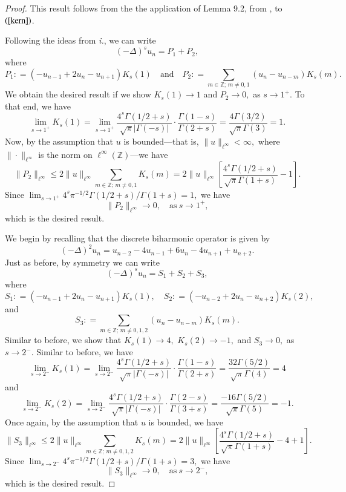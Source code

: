\documentclass[final,1p,times]{elsarticle}
\def\ZZ{\mathbb Z} %
\def\l{\left}
\def\r{\right}
\newcommand{\bb}[1]{\begin{equation}\label{#1}}
\newcommand{\ee}{\end{equation}}
\newcommand{\no}{\noindent}
\def\R#1{$(\ref{#1})$}
\theoremstyle{remark}
\theoremstyle{definition}
\begin{document}
\begin{proof}
\vspace{3mm}

\no{\em ii.} This result follows from the the application of Lemma 9.2, from \cite{ciaurri2016nonlocal}, to \R{kern}.

\vspace{3mm}

\no{\em iii.} Following the ideas from {\em i.}, we can write
$$(-\Delta)^s u_n = P_1 + P_2,$$
where
$$P_1\mathrel{\mathop:}= (-u_{n-1}+2u_n-u_{n+1})K_s(1)\quad\mbox{and}\quad P_2\mathrel{\mathop:}= \sum_{m\in\ZZ;\,m\neq 0,1} (u_n - u_{n-m})K_s(m).$$
We obtain the desired result if we show $K_s(1) \to 1$ and $P_2 \to 0,$ as $s\to 1^+.$ To that end, we have
$$\lim_{s\to 1^+} K_s(1) = \lim_{s\to 1^+} \frac{4^s\Gamma(1/2+s)}{\sqrt{\pi}|\Gamma(-s)|}\cdot\frac{\Gamma(1-s)}{\Gamma(2+s)} = \frac{4\Gamma(3/2)}{\sqrt{\pi}\Gamma(3)} = 1.$$
Now, by the assumption that $u$ is bounded---that is, $\|u\|_{\ell^\infty} < \infty,$ where $\|\cdot\|_{\ell^\infty}$ is the norm  on $\ell^\infty(\ZZ)$---we have
$$\|P_2\|_{\ell^\infty} \le 2\|u\|_{\ell^\infty}\sum_{m\in\ZZ;\,m\neq 0,1} K_s(m) = 2\|u\|_{\ell^\infty}\l[\frac{4^s\Gamma(1/2+s)}{\sqrt{\pi}\Gamma(1+s)} - 1\r].$$
Since $\textstyle\lim_{s\to 1^+} 4^s\pi^{-1/2}\Gamma(1/2+s)/\Gamma(1+s) = 1,$ we have 
$$\|P_2\|_{\ell^\infty} \to 0, \quad \mbox{as}\ s\to 1^+,$$
which is the desired result.

\vspace{3mm}

\no{\em iv.} We begin by recalling that the discrete biharmonic operator is given by
\bb{biharm}
(-\Delta)^2u_n = u_{n-2} - 4u_{n-1} + 6u_n - 4u_{n+1} + u_{n+2}.
\ee
Just as before, by symmetry we can write
$$(-\Delta)^su_n = S_1 + S_2 + S_3,$$
where
$$S_1 \mathrel{\mathop:}= (-u_{n-1}+2u_n-u_{n+1})K_s(1),\quad S_2 \mathrel{\mathop:}= (-u_{n-2} + 2u_n - u_{n+2})K_s(2),$$
and
$$S_3 \mathrel{\mathop:}= \sum_{m\in\ZZ;\,m\neq 0,1,2} (u_n - u_{n-m})K_s(m).$$
Similar to before, we show that $K_s(1) \to 4,$ $K_s(2) \to -1,$ and $S_3 \to 0,$ as $s\to 2^-.$ Similar to before, we have
$$\lim_{s\to 2^-}K_s(1) = \lim_{s\to 2^-}\frac{4^s\Gamma(1/2+s)}{\sqrt{\pi}|\Gamma(-s)|}\cdot\frac{\Gamma(1-s)}{\Gamma(2+s)} = \frac{32\Gamma(5/2)}{\sqrt{\pi}\Gamma(4)} = 4$$
and
$$\lim_{s\to 2^-}K_s(2) = \lim_{s\to 2^-}\frac{4^s\Gamma(1/2+s)}{\sqrt{\pi}|\Gamma(-s)|}\cdot\frac{\Gamma(2-s)}{\Gamma(3+s)} = \frac{-16\Gamma(5/2)}{\sqrt{\pi}\Gamma(5)} = -1.$$
Once again, by the assumption that $u$ is bounded, we have
$$\|S_3\|_{\ell^\infty} \le 2\|u\|_{\ell^\infty} \sum_{m\in\ZZ;\,m\neq 0,1,2}K_s(m) = 2\|u\|_{\ell^\infty}\l[\frac{4^s\Gamma(1/2+s)}{\sqrt{\pi}\Gamma(1+s)} - 4 + 1\r].$$
Since $\textstyle\lim_{s\to 2^-} 4^s\pi^{-1/2}\Gamma(1/2+s)/\Gamma(1+s) = 3,$ we have 
$$\|S_3\|_{\ell^\infty} \to 0, \quad \mbox{as}\ s\to 2^-,$$
which is the desired result.
\end{proof}
\end{document}
